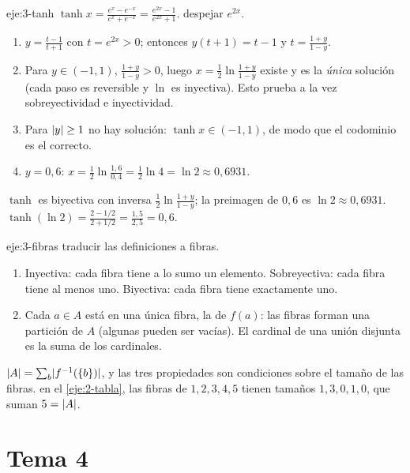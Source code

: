 \begin{solucion}{eje:3-tanh}
\datos $\tanh x=\tfrac{e^{x}-e^{-x}}{e^{x}+e^{-x}}=\tfrac{e^{2x}-1}{e^{2x}+1}$.
\planteamiento despejar $e^{2x}$.
\pasos
\begin{enumerate}[label=\arabic*.]
  \item $y=\tfrac{t-1}{t+1}$ con $t=e^{2x}>0$; entonces $y(t+1)=t-1$ y $t=\tfrac{1+y}{1-y}$.
  \item Para $y\in(-1,1)$, $\tfrac{1+y}{1-y}>0$, luego $x=\tfrac12\ln\tfrac{1+y}{1-y}$ existe y es la \emph{única} solución (cada paso es reversible y $\ln$ es inyectiva). Esto prueba a la vez sobreyectividad e inyectividad.
  \item Para $\lvert y\rvert\ge1$ no hay solución: $\tanh x\in(-1,1)$, de modo que el codominio es el correcto.
  \item $y=0{,}6$: $x=\tfrac12\ln\tfrac{1{,}6}{0{,}4}=\tfrac12\ln4=\ln2\approx0{,}6931$.
\end{enumerate}
\resultado $\tanh$ es biyectiva con inversa $\tfrac12\ln\tfrac{1+y}{1-y}$; la preimagen de $0{,}6$ es $\ln2\approx0{,}6931$.
\comprobacion $\tanh(\ln2)=\tfrac{2-1/2}{2+1/2}=\tfrac{1{,}5}{2{,}5}=0{,}6$.
\end{solucion}

\begin{solucion}{eje:3-fibras}
\planteamiento traducir las definiciones a fibras.
\pasos
\begin{enumerate}[label=\arabic*.]
  \item Inyectiva: cada fibra tiene a lo sumo un elemento. Sobreyectiva: cada fibra tiene al menos uno. Biyectiva: cada fibra tiene exactamente uno.
  \item Cada $a\in A$ está en una única fibra, la de $f(a)$: las fibras forman una partición de $A$ (algunas pueden ser vacías). El cardinal de una unión disjunta es la suma de los cardinales.
\end{enumerate}
\resultado $\lvert A\rvert=\sum_b\lvert f^{-1}(\{b\})\rvert$, y las tres propiedades son condiciones sobre el tamaño de las fibras.
\comprobacion en el \cref{eje:2-tabla}, las fibras de $1,2,3,4,5$ tienen tamaños $1,3,0,1,0$, que suman $5=\lvert A\rvert$.
\end{solucion}

\section{Tema 4}


